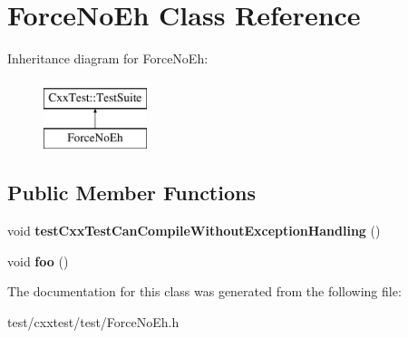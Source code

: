 \hypertarget{classForceNoEh}{\section{Force\-No\-Eh Class Reference}
\label{classForceNoEh}
}
Inheritance diagram for Force\-No\-Eh\-:\begin{figure}[H]
\begin{center}
\leavevmode
\includegraphics[height=2.000000cm]{classForceNoEh}
\end{center}
\end{figure}
\subsection*{Public Member Functions}
\begin{DoxyCompactItemize}
\item 
\hypertarget{classForceNoEh_abe967f9e39eba1c8674517e9efd3c1de}{void {\bfseries test\-Cxx\-Test\-Can\-Compile\-Without\-Exception\-Handling} ()}\label{classForceNoEh_abe967f9e39eba1c8674517e9efd3c1de}

\item 
\hypertarget{classForceNoEh_a8f62139e5d1d3c74253c73c727a2d921}{void {\bfseries foo} ()}\label{classForceNoEh_a8f62139e5d1d3c74253c73c727a2d921}

\end{DoxyCompactItemize}


The documentation for this class was generated from the following file\-:\begin{DoxyCompactItemize}
\item 
test/cxxtest/test/Force\-No\-Eh.\-h\end{DoxyCompactItemize}
